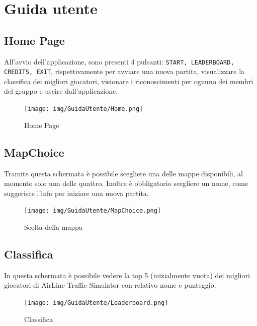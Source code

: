 \documentclass[a4paper,12pt]{report}
\begin{document}
\appendix
\chapter{Guida utente}
\section*{Home Page}
All'avvio dell'applicazione, sono presenti 4 pulsanti: \texttt{START, LEADERBOARD, CREDITS, EXIT}, rispettivamente per avviare una nuova partita, visualizzare la classifica dei migliori giocatori, visionare i riconoscimenti per ognuno dei membri del gruppo e uscire dall'applicazione.
\begin{figure}[H]
    \begin{center}
        \centering
        \texttt{[image: img/GuidaUtente/Home.png]}
    \end{center}
    \caption{Home Page}
    \label{img:homepage}
\end{figure}

\section*{MapChoice}
Tramite questa schermata è possibile scegliere una delle mappe disponibili, al momento solo una delle quattro. Inoltre è obbligatorio scegliere un nome, come suggerisce l'info per iniziare una nuova partita.
\begin{figure}[H]
    \begin{center}
        \centering
        \texttt{[image: img/GuidaUtente/MapChoice.png]}
    \end{center}
    \caption{Scelta della mappa}
    \label{img:mapchoice}
\end{figure}

\clearpage

\section*{Classifica}
In questa schermata è possibile vedere la top 5 (inizialmente vuota) dei migliori giocatori di AirLine Traffic Simulator con relativo nome e punteggio.
\begin{figure}[H]
    \begin{center}
        \centering
        \texttt{[image: img/GuidaUtente/Leaderboard.png]}
    \end{center}
    \caption{Classifica}
    \label{img:leaderboard-png}
\end{figure}
\end{document}
